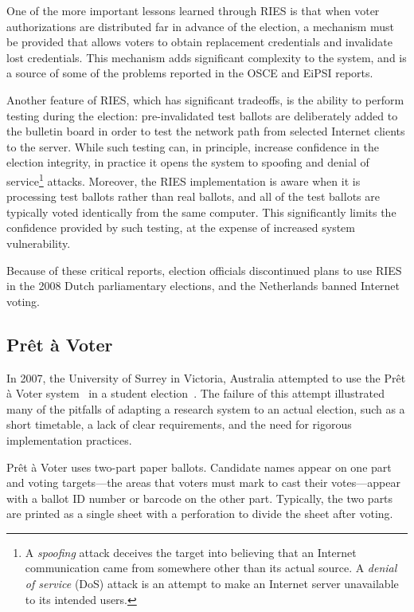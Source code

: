 One of the more important lessons learned through RIES is that when
voter authorizations are distributed far in advance of the election, a
mechanism must be provided that allows voters to obtain replacement
credentials and invalidate lost credentials. This mechanism adds
significant complexity to the system, and is a source of some of the
problems reported in the OSCE and EiPSI reports.

Another feature of RIES, which has significant tradeoffs, is the
ability to perform testing during the election: pre-invalidated test
ballots are deliberately added to the bulletin board in order to test
the network path from selected Internet clients to the server. While
such testing can, in principle, increase confidence in the election
integrity, in practice it opens the system to spoofing and denial of
service\footnote{A \emph{spoofing} attack deceives the target into
  believing that an Internet communication came from somewhere other
  than its actual source. A \emph{denial of service} (DoS) attack is
  an attempt to make an Internet server unavailable to its intended
  users.} attacks. Moreover, the RIES implementation is aware when it
is processing test ballots rather than real ballots, and all of the
test ballots are typically voted identically from the same
computer. This significantly limits the confidence provided by such
testing, at the expense of increased system vulnerability.

Because of these critical reports, election officials discontinued
plans to use RIES in the 2008 Dutch parliamentary elections, and the
Netherlands banned Internet voting.

\subsection{Prêt à Voter}
\label{sec:pret-voter}

In 2007, the University of Surrey in Victoria, Australia attempted to
use the Prêt à Voter system~\cite{chaum2005, burton2012} in a student
election~\cite{bismark2007}. The failure of this attempt illustrated
many of the pitfalls of adapting a research system to an actual
election, such as a short timetable, a lack of clear requirements, and
the need for rigorous implementation practices.

Prêt à Voter uses two-part paper ballots. Candidate names appear on
one part and voting targets---the areas that voters must mark to cast
their votes---appear with a ballot ID number or barcode on the other
part. Typically, the two parts are printed as a single sheet with a
perforation to divide the sheet after voting.


